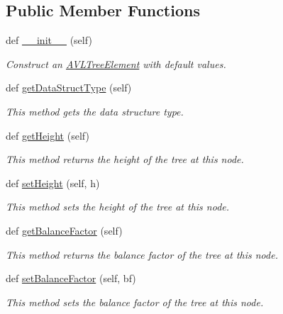 \subsection*{Public Member Functions}
\begin{DoxyCompactItemize}
\item 
def \hyperlink{class_a_v_l_tree_element_1_1_a_v_l_tree_element_a8e6be662898e513509f1d10368efa8da}{\+\_\+\+\_\+init\+\_\+\+\_\+} (self)
\begin{DoxyCompactList}\small\item\em Construct an \hyperlink{class_a_v_l_tree_element_1_1_a_v_l_tree_element}{A\+V\+L\+Tree\+Element} with default values. \end{DoxyCompactList}\item 
def \hyperlink{class_a_v_l_tree_element_1_1_a_v_l_tree_element_a640287202eba6921fbd438adb7cb49bf}{get\+Data\+Struct\+Type} (self)
\begin{DoxyCompactList}\small\item\em This method gets the data structure type. \end{DoxyCompactList}\item 
def \hyperlink{class_a_v_l_tree_element_1_1_a_v_l_tree_element_a6e03fb5147748af1b465285787d5a780}{get\+Height} (self)
\begin{DoxyCompactList}\small\item\em This method returns the height of the tree at this node. \end{DoxyCompactList}\item 
def \hyperlink{class_a_v_l_tree_element_1_1_a_v_l_tree_element_af068e3b5c1afb520aeff8bd75dd252ee}{set\+Height} (self, h)
\begin{DoxyCompactList}\small\item\em This method sets the height of the tree at this node. \end{DoxyCompactList}\item 
def \hyperlink{class_a_v_l_tree_element_1_1_a_v_l_tree_element_afb67818659c75a5e5105b26ee8ed94e4}{get\+Balance\+Factor} (self)
\begin{DoxyCompactList}\small\item\em This method returns the balance factor of the tree at this node. \end{DoxyCompactList}\item 
def \hyperlink{class_a_v_l_tree_element_1_1_a_v_l_tree_element_a3bccfd80115ddc1fe76912fdcae57520}{set\+Balance\+Factor} (self, bf)
\begin{DoxyCompactList}\small\item\em This method sets the balance factor of the tree at this node. \end{DoxyCompactList}\item 

\end{DoxyCompactItemize}
